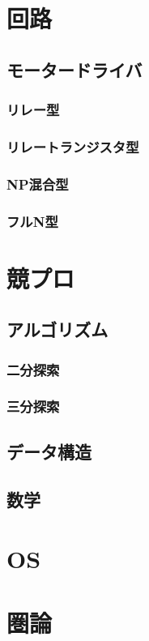 \documentclass{jarticle}
\begin{document}
\section{回路}
   \subsection{モータードライバ}
      \subsubsection{リレー型}
      \subsubsection{リレートランジスタ型}
      \subsubsection{NP混合型}
      \subsubsection{フルN型}
\clearpage
\section{競プロ}
   \subsection{アルゴリズム}
      \subsubsection{二分探索}
      \subsubsection{三分探索}
   \subsection{データ構造}
   \subsection{数学}
\clearpage
\section{OS}
\clearpage
\section{圏論}
\clearpage
\end{document}
